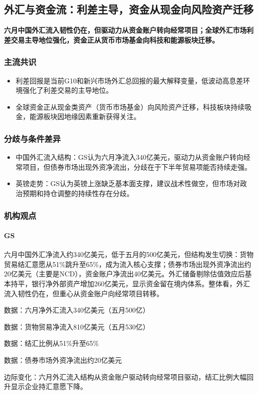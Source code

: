 \documentclass[11pt]{ctexart}
\begin{document}
\subsection{外汇与资金流：利差主导，资金从现金向风险资产迁移}
\textbf{六月中国外汇流入韧性仍在，但驱动力从资金账户转向经常项目；全球外汇市场利差交易主导地位强化，资金正从货币市场基金向科技和能源板块迁移。}
\subsubsection*{主流共识}
\begin{itemize}
  \item 利差回报是当前G10和新兴市场外汇总回报的最大解释变量，低波动高息差环境强化了利差交易的主导地位。
  \item 全球资金正从现金类资产（货币市场基金）向风险资产迁移，科技板块持续吸金，能源板块因地缘因素重新获得关注。
\end{itemize}
\subsubsection*{分歧与条件差异}
\begin{itemize}
  \item 中国外汇流入结构：GS认为六月净流入340亿美元，驱动力从资金账户转向经常项目，但债券市场出现外资净流出，分歧在于下半年贸易项能否持续走强。
  \item 英镑走势：GS认为英镑上涨缺乏基本面支撑，建议战术性做空，但市场对政治预期和持仓调整的持续性存在分歧。
\end{itemize}
\subsubsection*{机构观点}
\paragraph{GS} 六月中国外汇净流入约340亿美元，低于五月的500亿美元，但结构发生切换：货物贸易结汇意愿从51\%跳升至65\%，成为流入核心支撑；债券市场出现外资净流出约20亿美元（主要是NCD），资金账户净流出40亿美元。外汇储备剔除估值效应后基本持平，银行净外部资产增加260亿美元，显示资金留在境内体系。整体看，外汇流入韧性仍在，但重心从资金账户向经常项目转移。
{\small\color{refgray}数据：六月净外汇流入340亿美元（五月500亿）\par}
{\small\color{refgray}数据：货物贸易净流入810亿美元（五月530亿）\par}
{\small\color{refgray}数据：结汇比例从51\%升至65\%\par}
{\small\color{refgray}数据：债券市场外资净流出约20亿美元\par}
{\small\color{refgray}边际变化：六月外汇流入结构从资金账户驱动转向经常项目驱动，结汇比例大幅回升显示企业持汇意愿下降。\par}
\end{document}
